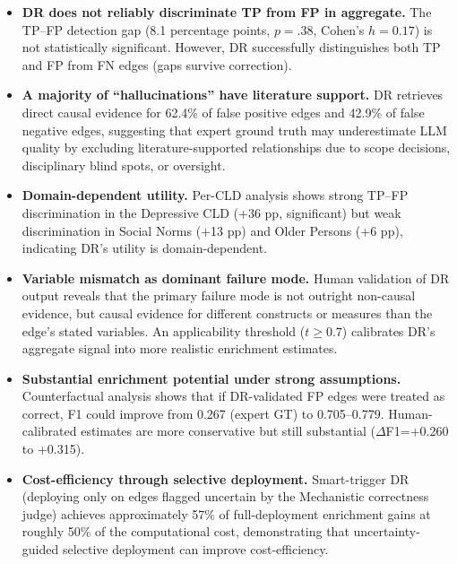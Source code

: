 \begin{itemize}[noitemsep]
    \item \textbf{DR does not reliably discriminate TP from FP in aggregate.} The TP--FP detection gap (8.1 percentage points, $p=.38$, Cohen's $h=0.17$) is not statistically significant. However, DR successfully distinguishes both TP and FP from FN edges (gaps survive correction).
    
    \item \textbf{A majority of ``hallucinations'' have literature support.} DR retrieves direct causal evidence for 62.4\% of false positive edges and 42.9\% of false negative edges, suggesting that expert ground truth may underestimate LLM quality by excluding literature-supported relationships due to scope decisions, disciplinary blind spots, or oversight.
    
    \item \textbf{Domain-dependent utility.} Per-CLD analysis shows strong TP--FP discrimination in the Depressive CLD (+36 pp, significant) but weak discrimination in Social Norms (+13 pp) and Older Persons (+6 pp), indicating DR's utility is domain-dependent.
    
    \item \textbf{Variable mismatch as dominant failure mode.} Human validation of DR output reveals that the primary failure mode is not outright non-causal evidence, but causal evidence for different constructs or measures than the edge's stated variables. An applicability threshold ($t\geq0.7$) calibrates DR's aggregate signal into more realistic enrichment estimates.
    
    \item \textbf{Substantial enrichment potential under strong assumptions.} Counterfactual analysis shows that if DR-validated FP edges were treated as correct, F1 could improve from 0.267 (expert GT) to 0.705--0.779. Human-calibrated estimates are more conservative but still substantial ($\Delta$F1=+0.260 to +0.315).
    
    \item \textbf{Cost-efficiency through selective deployment.} Smart-trigger DR (deploying only on edges flagged uncertain by the Mechanistic correctness judge) achieves approximately 57\% of full-deployment enrichment gains at roughly 50\% of the computational cost, demonstrating that uncertainty-guided selective deployment can improve cost-efficiency.
\end{itemize}

